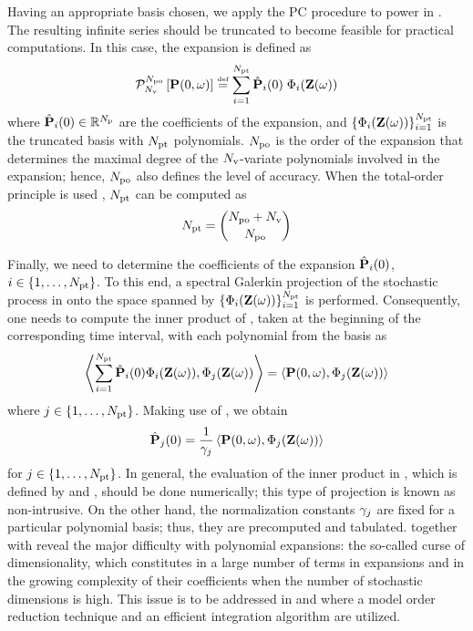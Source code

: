 Having an appropriate basis chosen, we apply the PC procedure to power in . The resulting infinite series should be truncated to become feasible for practical computations. In this case, the expansion is defined as
\begin{equation} \elabel{pc-expansion}
  \oPC{\vars}{\pcorder}{\vP(0, \o)} \eqdef \sum_{i = 1}^{\pcterms} \pcc{\vP}_i(0) \; \pcb_i(\vZ(\o))
\end{equation}
where $\hat{\mathbf{P}}_i(0) \in \mathbb{R}^{N_\text{p}}$ are the coefficients of the expansion, and $\{ \Phi_i(\mathbf{Z}(\omega)) \}_{i = 1}^{{N_\text{pt}}}$ is the truncated basis with ${N_\text{pt}}$ polynomials. ${N_\text{po}}$ is the order of the expansion that determines the maximal degree of the ${N_\text{v}}$-variate polynomials involved in the expansion; hence, ${N_\text{po}}$ also defines the level of accuracy. When the total-order principle is used \cite{eldred2009}, ${N_\text{pt}}$ can be computed as
\begin{equation} \elabel{pc-terms}
  \pcterms = {\pcorder + \vars \choose \pcorder}
\end{equation}

Finally, we need to determine the coefficients of the expansion $\hat{\mathbf{P}}_i(0)$, $i \in \{ 1, \dotsc, {N_\text{pt}} \}$. To this end, a spectral Galerkin projection of the stochastic process in  onto the space spanned by $\{ \Phi_i(\mathbf{Z}(\omega)) \}_{i = 1}^{{N_\text{pt}}}$ is performed. Consequently, one needs to compute the inner product of , taken at the beginning of the corresponding time interval, with each polynomial from the basis as
\[
  \oInner{\sum_{i=1}^{\pcterms} \pcc{\vP}_i(0) \pcb_i(\vZ(\o))}{\pcb_j(\vZ(\o))} = \oInner{\vP(0, \o)}{\pcb_j(\vZ(\o))}
\]
where $j \in \{ 1, \dotsc, {N_\text{pt}} \}$. Making use of , we obtain
\begin{equation} \elabel{pc-coefficients}
  \pcc{\vP}_j(0) = \frac{1}{\pcn_j} \oInner{\vP(0, \o)}{\pcb_j(\vZ(\o))}
\end{equation}
for $j \in \{ 1, \dotsc, {N_\text{pt}} \}$. In general, the evaluation of the inner product in , which is defined by  and , should be done numerically; this type of projection is known as non-intrusive. On the other hand, the normalization constants $\gamma_j$ are fixed for a particular polynomial basis; thus, they are precomputed and tabulated.  together with  reveal the major difficulty with polynomial expansions: the so-called curse of dimensionality, which constitutes in a large number of terms in expansions and in the growing complexity of their coefficients when the number of stochastic dimensions is high. This issue is to be addressed in  and  where a model order reduction technique and an efficient integration algorithm are utilized.

